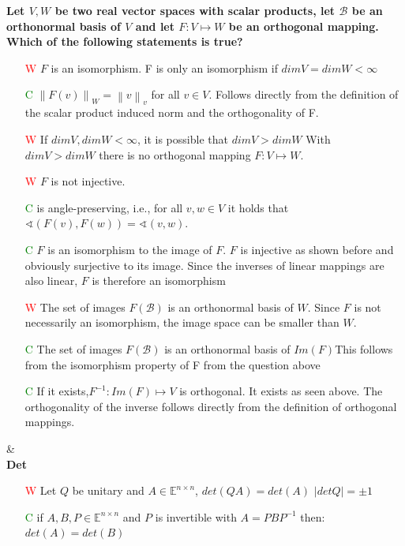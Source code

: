 \documentclass[7pt,landscape, margin = 0.1mm]{article}
\begin{document}
\begin{multicols}{4}
\begin{flushleft}
\textbf{ Let $V,W$ be two real vector spaces with scalar products, let $\mathcal{B}$ be an orthonormal basis of $V$ and let
$F : V \mapsto W$ be an orthogonal mapping. Which of the following statements is true? }
\begin{itemize}
\item[\textcolor{red}{W}] $F$ is an isomorphism. 
\textcolor{Emerald}{F is only an isomorphism if $dim V = dimW < \infty$}
\item[\textcolor{green}{C}] $\left\| F(v) \right\|_W = \left\|v \right\|_v$ for all $v \in V$.
\textcolor{Emerald}{Follows directly from the definition of the scalar product induced norm and the orthogonality
of F.}
\item[\textcolor{red}{W}] If $dimV, dimW < \infty $, it is possible that $dimV > dimW$
\textcolor{Emerald}{With $dimV > dimW$ there is no orthogonal mapping $F : V \mapsto W$}.
\item[\textcolor{red}{W}] $F$ is not injective.
\item[\textcolor{green}{C}] is angle-preserving, i.e., for all $v,w \in V$ it holds that $\sphericalangle (F(v), F(w)) = \sphericalangle (v,w)$.
\item[\textcolor{green}{C}] $F$ is an isomorphism to the image of $F$.
\textcolor{Emerald}{$F$ is injective as shown before and obviously surjective to its image. Since the inverses
of linear mappings are also linear, $F$ is therefore an isomorphism}
\item[\textcolor{red}{W}] The set of images $F(\mathcal{B})$ is an orthonormal basis of $W$.
\textcolor{Emerald}{Since $F$ is not necessarily an isomorphism, the image space can be smaller than $W$.}
\item[\textcolor{green}{C}] The set of images $F(\mathcal{B})$ is an orthonormal basis of $Im(F)$\textcolor{Emerald}{This follows from the isomorphism property of F from the question above}
\item[\textcolor{green}{C}]If it exists,$ F^{-1} : Im(F) \mapsto V$ is orthogonal.
 \textcolor{Emerald}{It exists as seen above. The orthogonality of the inverse follows directly from the definition
of orthogonal mappings.}
\end{itemize}
\hspace{3mm}
\hline & \\[3mm]

\scriptsize
\textbf{Det}
\tiny \\
\begin{itemize}
\item[\textcolor{red}{W}] Let $Q $ be unitary and  $A \in \mathbb{E}^{n \times n} $, $det(QA) = det(A) $ \textcolor{Emerald}{$|det Q| =\pm 1 $}
\item[\textcolor{green}{C}] if $A,B,P \in \mathbb{E}^{n \times n} $ and $P$ is invertible with $A=PBP^{-1}$ then: $det(A)=det(B)$
\end{itemize}
\hspace{3mm}


\end{flushleft}
\end{multicols}
\end{document}
